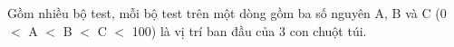 Gồm nhiều bộ test, mỗi bộ test trên một dòng gồm ba số nguyên A, B và C (0 $<$ A $<$ B $<$ C $<$ 100) là vị trí ban đầu của 3 con chuột túi.